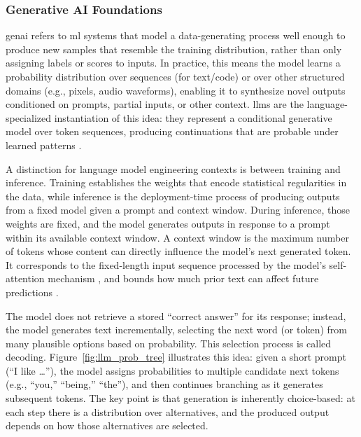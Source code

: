 \subsubsection{Generative AI Foundations}
\label{subsec:genai_foundations}

\ac{genai} refers to \ac{ml} systems that model a data-generating process well enough to produce new samples that resemble the training distribution, rather than only assigning labels or scores to inputs. In practice, this means the model learns a probability distribution over sequences (for text/code) or over other structured domains (e.g., pixels, audio waveforms), enabling it to synthesize novel outputs conditioned on prompts, partial inputs, or other context. \acp{llm} are the language-specialized instantiation of this idea: they represent a conditional generative model over token sequences, producing continuations that are probable under learned patterns \cite{vaswani_AttentionAllYou_2017}.

A distinction for language model engineering contexts is between training and inference. Training establishes the weights that encode statistical regularities in the data, while inference is the deployment-time process of producing outputs from a fixed model given a prompt and context window. During inference, those weights are fixed, and the model generates outputs in response to a prompt within its available context window. A context window is the maximum number of tokens whose content can directly influence the model’s next generated token. It corresponds to the fixed-length input sequence processed by the model’s self-attention mechanism \cite{vaswani_AttentionAllYou_2017}, and bounds how much prior text can affect future predictions \cite{brown_LanguageModelsAre_2020, anthropic_ContextWindows_2025 }.


The model does not retrieve a stored “correct answer” for its response; instead, the model generates text incrementally, selecting the next word (or token) from many plausible options based on probability. This selection process is called decoding. Figure~\ref{fig:llm_prob_tree} illustrates this idea: given a short prompt (“I like …”), the model assigns probabilities to multiple candidate next tokens (e.g., “you,” “being,” “the”), and then continues branching as it generates subsequent tokens. The key point is that generation is inherently choice-based: at each step there is a distribution over alternatives, and the produced output depends on how those alternatives are selected.


